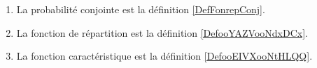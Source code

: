 
\begin{enumerate}
    \item
        La probabilité conjointe est la définition \ref{DefFonrepConj}.
    \item
        La fonction de répartition est la définition \ref{DefooYAZVooNdxDCx}.
    \item
        La fonction caractéristique est la définition \ref{DefooEIVXooNtHLQQ}.
\end{enumerate}

